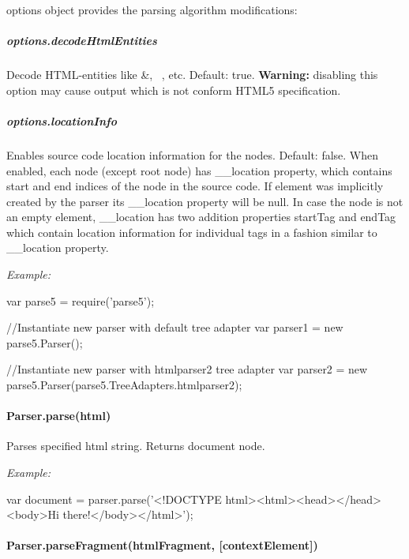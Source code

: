 {\ttfamily options} object provides the parsing algorithm modifications\+: \subparagraph*{options.\+decode\+Html\+Entities}

Decode H\+T\+M\+L-\/entities like {\ttfamily \&}, {\ttfamily ~}, etc. Default\+: {\ttfamily true}. {\bfseries Warning\+:} disabling this option may cause output which is not conform H\+T\+M\+L5 specification. \subparagraph*{options.\+location\+Info}

Enables source code location information for the nodes. Default\+: {\ttfamily false}. When enabled, each node (except root node) has {\ttfamily \+\_\+\+\_\+location} property, which contains {\ttfamily start} and {\ttfamily end} indices of the node in the source code. If element was implicitly created by the parser it\textquotesingle{}s {\ttfamily \+\_\+\+\_\+location} property will be {\ttfamily null}. In case the node is not an empty element, {\ttfamily \+\_\+\+\_\+location} has two addition properties {\ttfamily start\+Tag} and {\ttfamily end\+Tag} which contain location information for individual tags in a fashion similar to {\ttfamily \+\_\+\+\_\+location} property.

{\itshape Example\+:} 
\begin{DoxyCode}
var parse5 = require('parse5');

//Instantiate new parser with default tree adapter
var parser1 = new parse5.Parser();

//Instantiate new parser with htmlparser2 tree adapter
var parser2 = new parse5.Parser(parse5.TreeAdapters.htmlparser2);
\end{DoxyCode}


\paragraph*{\textbullet{} Parser.\+parse(html)}

Parses specified {\ttfamily html} string. Returns {\ttfamily document} node.

{\itshape Example\+:} 
\begin{DoxyCode}
var document = parser.parse('<!DOCTYPE html><html><head></head><body>Hi there!</body></html>');
\end{DoxyCode}


\paragraph*{\textbullet{} Parser.\+parse\+Fragment(html\+Fragment, \mbox{[}context\+Element\mbox{]})}

